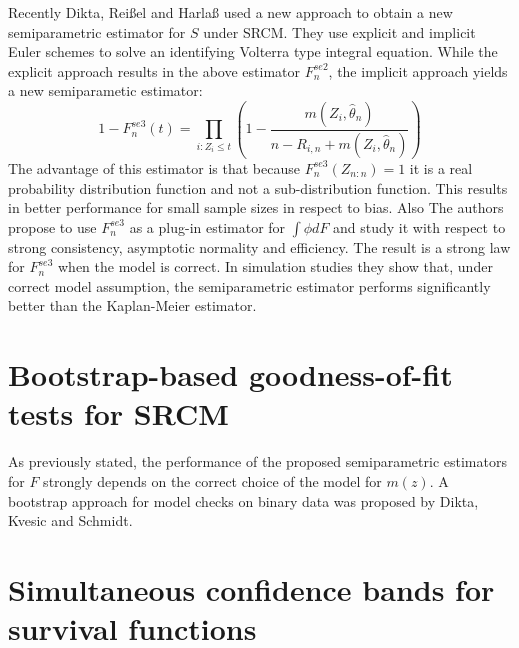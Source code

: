 Recently Dikta, Reißel and Harlaß used a new approach to obtain a new semiparametric estimator for $S$ under SRCM. They use explicit and implicit Euler schemes to solve an identifying Volterra type integral equation. While the explicit approach results in the above estimator $F_n^{se2}$, the implicit approach yields a new semiparametic estimator:
\begin{equation}\label{fnse3}
1-F_n^{se3}(t) = \prod_{i:Z_i \leq t} \left( 1 - \frac{m(Z_i,\hat{\theta}_n)}{n-R_{i,n} + m(Z_i,\hat{\theta}_n)} \right)
\end{equation}
The advantage of this estimator is that because $F_n^{se3}(Z_{n:n}) = 1$ it is a real probability distribution function and not a sub-distribution function. This results in better performance for small sample sizes in respect to bias. Also 
The authors propose to use $F_n^{se3}$ as a plug-in estimator for $\int\phi dF$ and study it with respect to strong consistency, asymptotic normality and efficiency. The result is a strong law for $F_n^{se3}$ when the model is correct. In simulation studies they show that, under correct model assumption, the semiparametric estimator performs significantly better than the Kaplan-Meier estimator\cite{PAPER7}.

\section{Bootstrap-based goodness-of-fit tests for SRCM}

As previously stated, the performance of the proposed semiparametric estimators for $F$ strongly depends on the correct choice of the model for $m(z)$. A bootstrap approach for model checks on binary data was proposed by Dikta, Kvesic and Schmidt\cite{PAPER4}.

\section{Simultaneous confidence bands for survival functions}